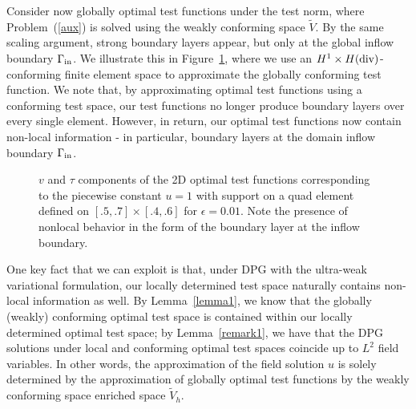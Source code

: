 \documentclass[11pt,onecolumn]{scrartcl}
\begin{document}
Consider now globally optimal test functions under the test norm, where Problem~(\ref{aux}) is solved using the weakly conforming space $\tilde{V}$.  By the same scaling argument, strong boundary layers appear, but only at the global inflow boundary $\Gamma_{\rm in}$.  We illustrate this in Figure~\ref{fig:optTestBoundaryGlobal}, where we use an $H^1\times H({\rm div})$-conforming finite element space to approximate the globally conforming test function.  We note that, by approximating optimal test functions using a conforming test space, our test functions no longer produce boundary layers over every single element. However, in return, our optimal test functions now contain non-local information - in particular, boundary layers at the domain inflow boundary $\Gamma_{\rm in}$.
\begin{figure}[!h]
\centering
{}
\caption{$v$ and $\tau$ components of the 2D optimal test functions corresponding to the piecewise constant $u=1$ with support on a quad element defined on $[.5,.7]\times[.4,.6]$ for $\epsilon = 0.01$. Note the presence of nonlocal behavior in the form of the boundary layer at the inflow boundary.}
\label{fig:optTestBoundaryGlobal}
\end{figure}
One key fact that we can exploit is that, under DPG with the ultra-weak variational formulation, our locally determined test space naturally contains non-local information as well.  By Lemma~\ref{lemma1}, we know that the globally (weakly) conforming optimal test space is contained within our locally determined optimal test space; by Lemma~\ref{remark1}, we have that the DPG solutions under local and conforming optimal test spaces coincide up to $L^2$ field variables.  In other words, the approximation of the field solution $u$ is solely determined by the approximation of globally optimal test functions by the weakly conforming space enriched space $\tilde{V}_h$.  
\end{document}
